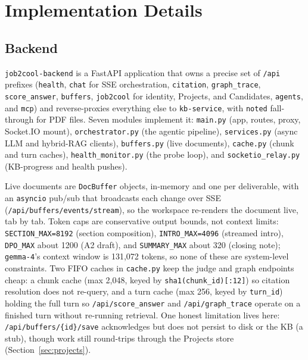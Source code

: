 \section{Implementation Details}

\subsection{Backend}
\label{sec:impl-backend}

\verb|job2cool-backend| is a FastAPI application that owns a precise set of \verb|/api|
prefixes (\verb|health|, \verb|chat| for SSE orchestration, \verb|citation|,
\verb|graph_trace|, \verb|score_answer|, \verb|buffers|, \verb|job2cool| for identity,
Projects, and Candidates, \verb|agents|, and \verb|mcp|) and reverse-proxies everything
else to \verb|kb-service|, with \verb|noted| fall-through for PDF files. Seven modules
implement it: \verb|main.py| (app, routes, proxy, Socket.IO mount), \verb|orchestrator.py|
(the agentic pipeline), \verb|services.py| (async LLM and hybrid-RAG clients),
\verb|buffers.py| (live documents), \verb|cache.py| (chunk and turn caches),
\verb|health_monitor.py| (the probe loop), and \verb|socketio_relay.py| (KB-progress and
health pushes).

Live documents are \verb|DocBuffer| objects, in-memory and one per deliverable, with an
\verb|asyncio| pub/sub that broadcasts each change over SSE
(\verb|/api/buffers/events/stream|), so the workspace re-renders the document live, tab by
tab. Token caps are conservative output bounds, not context limits: \verb|SECTION_MAX=8192|
(section composition), \verb|INTRO_MAX=4096| (streamed intro), \verb|DPO_MAX| about 1200
(A2 draft), and \verb|SUMMARY_MAX| about 320 (closing note); \verb|gemma-4|'s context
window is 131,072 tokens, so none of these are system-level constraints. Two FIFO caches in
\verb|cache.py| keep the judge and graph endpoints cheap: a chunk cache (max 2,048, keyed
by \verb|sha1(chunk_id)[:12]|) so citation resolution does not re-query, and a turn cache
(max 256, keyed by \verb|turn_id|) holding the full turn so \verb|/api/score_answer| and
\verb|/api/graph_trace| operate on a finished turn without re-running retrieval. One honest
limitation lives here: \verb|/api/buffers/{id}/save| acknowledges but does not persist to
disk or the KB (a stub), though work still round-trips through the Projects store
(Section~\ref{sec:projects}).

